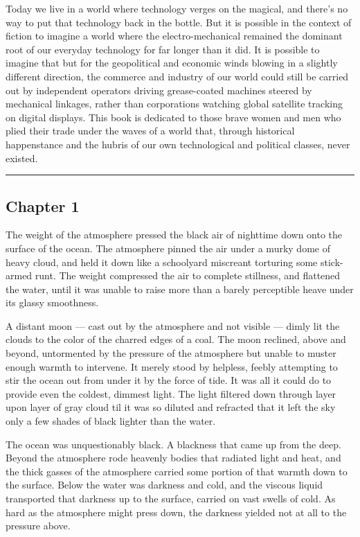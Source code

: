 \documentclass[]{article}
\begin{document}
Today we live in a world where technology verges on the magical, and
there's no way to put that technology back in the bottle. But it is
possible in the context of fiction to imagine a world where the
electro-mechanical remained the dominant root of our everyday technology
for far longer than it did. It is possible to imagine that but for the
geopolitical and economic winds blowing in a slightly different
direction, the commerce and industry of our world could still be carried
out by independent operators driving grease-coated machines steered by
mechanical linkages, rather than corporations watching global satellite
tracking on digital displays. This book is dedicated to those brave
women and men who plied their trade under the waves of a world that,
through historical happenstance and the hubris of our own technological
and political classes, never existed.

\begin{center}\rule{0.5\linewidth}{\linethickness}\end{center}

\hypertarget{chapter-1}{%
\subsection{Chapter 1}\label{chapter-1}}

The weight of the atmosphere pressed the black air of nighttime down
onto the surface of the ocean. The atmosphere pinned the air under a
murky dome of heavy cloud, and held it down like a schoolyard miscreant
torturing some stick-armed runt. The weight compressed the air to
complete stillness, and flattened the water, until it was unable to
raise more than a barely perceptible heave under its glassy smoothness.

A distant moon --- cast out by the atmosphere and not visible --- dimly
lit the clouds to the color of the charred edges of a coal. The moon
reclined, above and beyond, untormented by the pressure of the
atmosphere but unable to muster enough warmth to intervene. It merely
stood by helpless, feebly attempting to stir the ocean out from under it
by the force of tide. It was all it could do to provide even the
coldest, dimmest light. The light filtered down through layer upon layer
of gray cloud til it was so diluted and refracted that it left the sky
only a few shades of black lighter than the water.

The ocean was unquestionably black. A blackness that came up from the
deep. Beyond the atmosphere rode heavenly bodies that radiated light and
heat, and the thick gasses of the atmosphere carried some portion of
that warmth down to the surface. Below the water was darkness and cold,
and the viscous liquid transported that darkness up to the surface,
carried on vast swells of cold. As hard as the atmosphere might press
down, the darkness yielded not at all to the pressure above.
\end{document}
